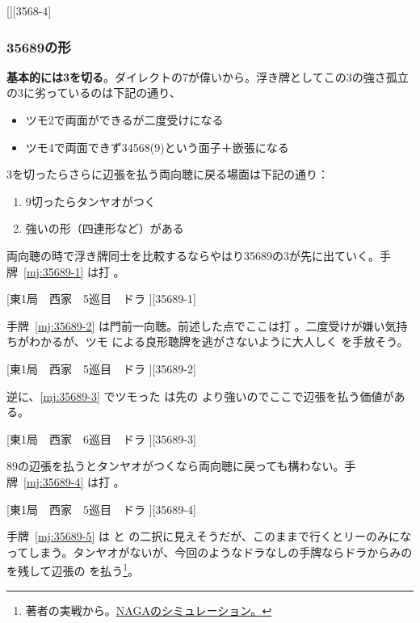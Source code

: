\documentclass[../nankiru_main.tex]{subfiles}
\begin{document}
[][3568-4]

\subsubsection{35689の形}

\textbf{基本的には3を切る}。ダイレクトの7が偉いから。浮き牌としてこの3の強さ孤立の3に劣っているのは下記の通り、

\begin{itemize}
\item ツモ2で両面ができるが二度受けになる
\item ツモ4で両面できず34568(9)という面子＋嵌張になる
\end{itemize}

3を切ったらさらに辺張を払う両向聴に戻る場面は下記の通り\citep{yuusee-35689}：

\begin{enumerate}
\item 9切ったらタンヤオがつく
\item 強いの形（四連形など）がある
\end{enumerate}

両向聴の時で浮き牌同士を比較するならやはり35689の3が先に出ていく。手牌~\ref{mj:35689-1} は打 。

[東1局　西家　5巡目　ドラ ][35689-1]

手牌~\ref{mj:35689-2} は門前一向聴。前述した点でここは打 。二度受けが嫌い気持ちがわかるが、ツモ  による良形聴牌を逃がさないように大人しく  を手放そう。

[東1局　西家　5巡目　ドラ ][35689-2]

逆に、\ref{mj:35689-3} でツモった  は先の  より強いのでここで辺張を払う価値がある。

[東1局　西家　6巡目　ドラ ][35689-3]

89の辺張を払うとタンヤオがつくなら両向聴に戻っても構わない。手牌~\ref{mj:35689-4} は打 。

[東1局　西家　5巡目　ドラ ][35689-4]

手牌~\ref{mj:35689-5} は  と  の二択に見えそうだが、このままで行くとリーのみになってしまう。タンヤオがないが、今回のようなドラなしの手牌ならドラからみの  を残して辺張の  を払う\footnote{著者の実戦から。\href{https://naga.dmv.nico/htmls/b1ce439d70b8dfc48152e539f75e29d57763308a9de1dfafc95f65a9529f2757v2_2.html?tw=2}{NAGAのシミュレーション。}}。
\end{document}
